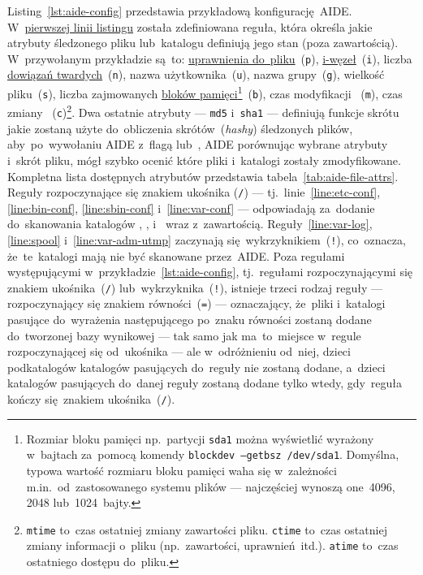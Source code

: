 \documentclass[thesis]{subfiles}
\begin{document}
Listing~\ref{lst:aide-config} przedstawia przykładową konfigurację~AIDE. W~\hyperref[line:custom-rule]{pierwszej linii listingu} została zdefiniowana reguła, która określa jakie atrybuty śledzonego pliku lub~katalogu definiują jego stan (poza zawartością). W~przywołanym przykładzie są~to: \href{https://www.linux.com/learn/understanding-linux-file-permissions}{uprawnienia do~pliku}~(\texttt{p}), \href{https://en.wikipedia.org/wiki/Inode}{i-węzeł}~(\texttt{i}), liczba \href{https://en.wikipedia.org/wiki/Hard_link}{dowiązań twardych}~(\texttt{n}), nazwa użytkownika~(\texttt{u}), nazwa grupy~(\texttt{g}), wielkość pliku~(\texttt{s}), liczba zajmowanych \href{https://en.wikipedia.org/wiki/Block_\%28data_storage\%29}{bloków pamięci}\footnote{Rozmiar bloku pamięci np.~partycji \texttt{sda1} można wyświetlić wyrażony w~bajtach za~pomocą komendy \texttt{blockdev --getbsz /dev/sda1}. Domyślna, typowa wartość rozmiaru bloku pamięci waha się w~zależności m.in.~od~zastosowanego systemu plików --- najczęściej wynoszą one~4096, 2048 lub~1024~bajty.}~(\texttt{b}), czas modyfikacji ~(\texttt{m}), czas zmiany ~(\texttt{c})\footnote{\texttt{mtime} to~czas ostatniej zmiany zawartości pliku. \texttt{ctime} to~czas ostatniej zmiany informacji o~pliku (np.~zawartości, uprawnień~itd.). \texttt{atime} to~czas ostatniego dostępu do~pliku.}. Dwa ostatnie atrybuty --- \texttt{md5} i~\texttt{sha1} --- definiują funkcje skrótu jakie zostaną użyte do~obliczenia skrótów~(\emph{hashy}) śledzonych plików, aby~po~wywołaniu AIDE z~flagą  lub~, AIDE porównując wybrane atrybuty i~skrót pliku, mógł szybko ocenić które pliki i~katalogi zostały zmodyfikowane. Kompletna lista dostępnych atrybutów przedstawia tabela~\ref{tab:aide-file-attrs}. Reguły rozpoczynające się znakiem ukośnika (\texttt{/}) --- tj.~linie~\ref{line:etc-conf}, \ref{line:bin-conf}, \ref{line:sbin-conf} i~\ref{line:var-conf} --- odpowiadają za~dodanie do~skanowania katalogów , ,  i~ wraz z~zawartością. Reguły~\ref{line:var-log}, \ref{line:spool} i~\ref{line:var-adm-utmp} zaczynają się~wykrzyknikiem~(\texttt{!}), co~oznacza, że~te~katalogi mają nie być skanowane przez~AIDE. Poza regułami występującymi w~przykładzie~\ref{lst:aide-config}, tj.~regułami rozpoczynającymi się znakiem ukośnika~(\texttt{/}) lub~wykrzyknika~(\texttt{!}), istnieje trzeci rodzaj reguły --- rozpoczynający się znakiem równości~(\texttt{=}) --- oznaczający, że~pliki i~katalogi pasujące do~wyrażenia następującego po~znaku równości zostaną dodane do~tworzonej bazy wynikowej --- tak samo jak ma~to~miejsce w~regule rozpoczynającej się od~ukośnika --- ale w~odróżnieniu od~niej, dzieci podkatalogów katalogów pasujących do~reguły nie zostaną dodane, a~dzieci katalogów pasujących do~danej reguły zostaną dodane tylko wtedy, gdy~reguła kończy się~znakiem ukośnika~(\texttt{/}).
\end{document}
